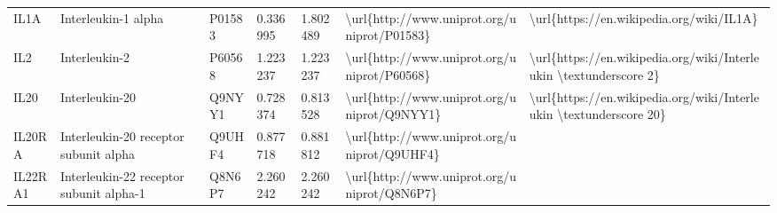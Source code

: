 \begin{table}[]
\begin{tabular}{lllllll}
\multicolumn{1}{l|}{IL1A}     & Interleukin-1 alpha                                           & P01583  & 0.336995           & 1.802489          & \textbackslash{}url\{http://www.uniprot.org/uniprot/P01583\} & \textbackslash{}url\{https://en.wikipedia.org/wiki/IL1A\}                                                                                                                                                                                                                                          \\
\multicolumn{1}{l|}{IL2}      & Interleukin-2                                                 & P60568  & 1.223237           & 1.223237          & \textbackslash{}url\{http://www.uniprot.org/uniprot/P60568\} & \textbackslash{}url\{https://en.wikipedia.org/wiki/Interleukin \textbackslash{}textunderscore 2\}                                                                                                                                                                                                  \\
\multicolumn{1}{l|}{IL20}     & Interleukin-20                                                & Q9NYY1  & 0.728374           & 0.813528          & \textbackslash{}url\{http://www.uniprot.org/uniprot/Q9NYY1\} & \textbackslash{}url\{https://en.wikipedia.org/wiki/Interleukin \textbackslash{}textunderscore 20\}                                                                                                                                                                                                 \\
\multicolumn{1}{l|}{IL20RA}   & Interleukin-20 receptor subunit alpha                         & Q9UHF4  & 0.877718           & 0.881812          & \textbackslash{}url\{http://www.uniprot.org/uniprot/Q9UHF4\} &                                                                                                                                                                                                                                                                                                    \\
\multicolumn{1}{l|}{IL22RA1}  & Interleukin-22 receptor subunit alpha-1                       & Q8N6P7  & 2.260242           & 2.260242          & \textbackslash{}url\{http://www.uniprot.org/uniprot/Q8N6P7\} &                                                                                                                                                                                                                                                                                                    \\

\end{tabular}
\end{table}
